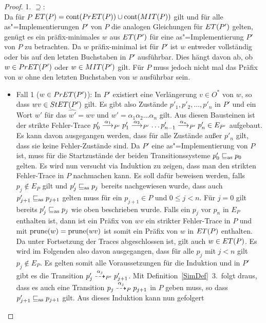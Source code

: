 \begin{proof}
  1. \glqq$\supseteq$\grqq{}:\\
  Da für $P$ $ET (P) = \mathrm{cont} (PrET (P)) \cup \mathrm{cont} (MIT (P))$ gilt und für
  alle as"=Implementierungen $P'$ von $P$ die analogen Gleichungen für $ET
  (P')$ gelten, genügt es ein präfix-minimales $w$ aus $ET (P')$ für eine
  as"=Implementierung $P'$ von $P$ zu betrachten. Da $w$ präfix-minimal ist für
  $P'$ ist $w$ entweder vollständig oder bis auf den letzten Buchstaben in $P'$
  ausführbar. Dies hängt davon ab, ob $w\in PrET (P')$ oder $w\in MIT (P')$
  gilt. Für $P$ muss jedoch nicht mal das Präfix von $w$ ohne den letzten
  Buchstaben von $w$ ausführbar sein.
  \begin{itemize}
    \item Fall 1 ($w\in PrET (P')$): In $P'$ existiert eine Verlängerung $v\in
      O^*$ von $w$, so dass $wv\in StET (P')$ gilt. Es gibt also Zustände
      $p'_1, p'_2,\dots ,p'_n$ in $P'$ und ein Wort $w'$ für das $\hat{w'}=wv$
      und $w'=\alpha _1\alpha _2\dots \alpha _n$ gilt. Aus diesen Bausteinen
      ist der strikte Fehler-Trace $p'_0 \must[\alpha _1]_{P'} p'_1
      \must[\alpha _2]_{P'} \dots p'_{n-1} \must[\alpha _n]_{P'} p'_n \in
      E_{P'}$ aufgebaut. Es kann \oBdA{} davon ausgegangen werden, dass für
      alle Zustände außer $p'_n$ gilt, dass sie keine Fehler-Zustände sind. Da
      $P'$ eine as"=Implementierung von $P$ ist, muss für die Startzustände der
      beiden Transitionssysteme $p'_0\sqsubseteq _{\mathrm{as}} p_0$ gelten. Es wird nun versucht
      via Induktion zu zeigen, dass man den strikten Fehler-Trace in $P$
      nachmachen kann. Es soll dafür beweisen werden, falls $p_j\notin E_P$
      gilt und $p'_j\sqsubseteq _{\mathrm{as}} p_j$ bereits nachgewiesen wurde, dass auch
      $p'_{j+1}\sqsubseteq _{\mathrm{as}} p_{j+1}$ gelten muss für ein $p_{j+1}\in P$ und $0\leq j
      < n$. Für $j=0$ gilt bereits $p'_j\sqsubseteq _{\mathrm{as}} p_j$ wie oben beschrieben wurde.
      Falls ein $p_j$ vor $p_n$ in $E_P$ enthalten ist, dann ist ein Präfix von
      $wv$ ein strikter Fehler-Trace in $P$ und mit $\mathrm{prune}(w)=\mathrm{prune}(wv)$ ist
      somit ein Präfix von $w$ in $ET (P)$ enthalten. Da \ET{} unter
      Fortsetzung der Traces abgeschlossen ist, gilt auch $w\in ET (P)$. Es
      wird im Folgenden also davon ausgegangen, dass für alle $p_j$ mit $j < n$
      gilt $p_j\notin E_P$. Es gelten somit alle Voraussetzungen für die
      Induktion und in $P'$ gibt es die Transition $p'_j \may[\alpha _{j}]_{P'}
      p'_{j+1}$. Mit Definition~\ref{SimDef}~3.\ folgt draus, dass es auch eine
      Transition $p_j \may[\alpha _{j}]_P p_{j+1}$ in $P$ geben muss, so dass
      $p'_{j+1}\sqsubseteq _{\mathrm{as}} p_{j+1}$ gilt. Aus dieses Induktion kann nun gefolgert

\end{itemize}
\end{proof}
